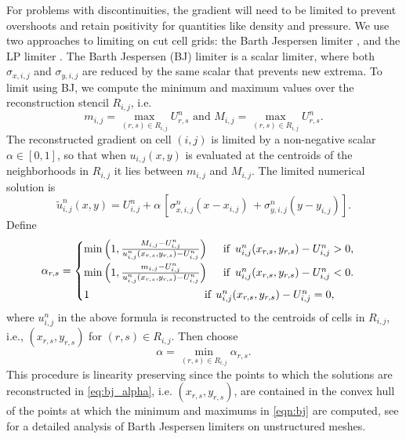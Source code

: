 For problems with discontinuities, the gradient will need to be limited
to prevent overshoots and retain positivity for quantities like density and
pressure.
We use two approaches to limiting on cut cell grids: the Barth Jespersen limiter \cite{barth-jespersen}, and the LP limiter \cite{May_Berger_LP}.
The Barth Jespersen (BJ) limiter is a scalar limiter, where both $\sigma_{x,i,j}$ and $\sigma_{y,i,j}$ are reduced by the same scalar that prevents new extrema.  
To limit using BJ, we compute the minimum and maximum values over the
reconstruction stencil $R_{i,j}$, i.e.
\begin{equation} 
     m_{i,j} = \max_{(r,s) \in R_{i,j}} U_{r,s}^n \text{ and } 
     M_{i,j} = \max_{(r,s) \in R_{i,j}} U_{r,s}^n.
\label{eqn:bj}
\end{equation}
The reconstructed gradient on cell $(i,j)$ is limited by a non-negative 
scalar $\alpha \in [0,1]$, so that when ${u}_{i,j}(x,y)$ 
is evaluated at the centroids of the neighborhoods in $R_{i,j}$ it
lies between $m_{i,j}$ and $M_{i,j}$.
The limited numerical solution is
\begin{equation}
     \tilde{u}^n_{i,j}(x,y) = U_{i,j}^n + \alpha \, [{\sigma}^n_{x,i,j} ( x -  x_{i,j}) \, 
   + {\sigma}^n_{y,i,j}( y -  y_{i,j})].
\end{equation}
Define
\begin{equation}\label{eq:bj_alpha}
    \alpha_{r,s} = \begin{cases}
           \min \left(1,\frac{M_{i,j}-U_{i,j}^n}{u^n_{i,j}(x_{r,s},y_{r,s}) - U_{i,j}^n} \right)
    \quad  \text{ if } \,  u^n_{i,j}( x_{r,s},  y_{r,s}) - U_{i,j}^n >  0,\\[.08in]
            \min \left(1, \frac{m_{i,j}-U_{i,j}^n}{u^n_{i,j}(x_{r,s},y_{r,s}) - U_{i,j}^n} \right)  
    \quad  \text{ if }  \, u^n_{i,j}(x_{r,s}, y_{r,s}) - U_{i,j}^n < 0.\\[.08in]
             1    \hspace*{1.45in}  \text{if} \; \, u^n_{i,j}(x_{r,s}, y_{r,s}) - U_{i,j}^n = 0,
    \end{cases}
\end{equation}
where $u^n_{i,j}$ in the above formula is reconstructed to the centroids of cells in $R_{i,j}$, i.e., $(x_{r,s}, y_{r,s})$ for $(r,s)\in R_{i,j}$.
Then choose
\begin{equation}\label{eqn:alpha}
\alpha = \min_{(r,s) \in R_{i,j}} \alpha_{r,s} .
\end{equation}
This procedure is linearity preserving since the points to which the solutions are reconstructed in \eqref{eq:bj_alpha}, i.e. $(x_{r,s}, y_{r,s})$, are contained in the convex hull of the points at which the minimum and maximums in \eqref{eqn:bj} are computed, see \cite{giuliani2018analysis} for a detailed analysis of Barth Jespersen limiters on unstructured meshes.

